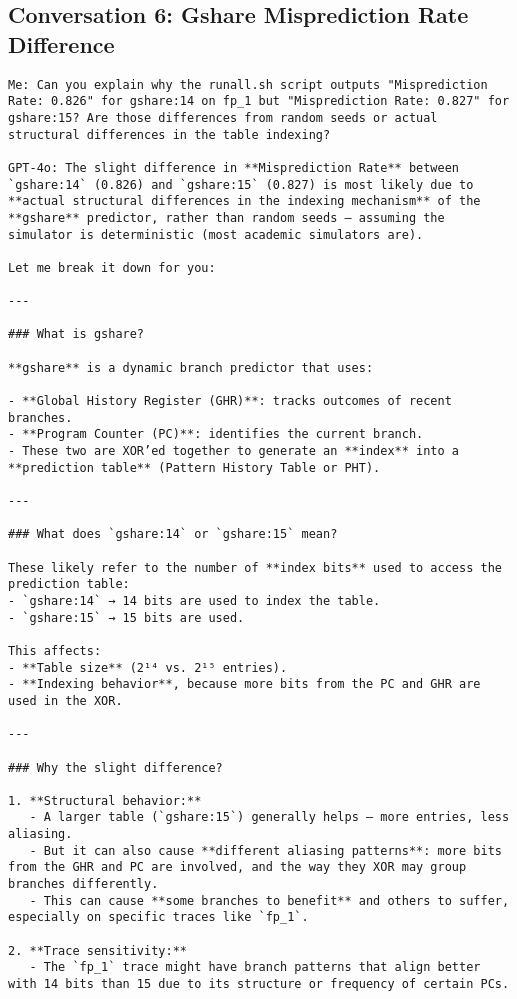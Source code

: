 \documentclass[sigconf, screen]{acmart}
\begin{document}
\subsection{Conversation 6: Gshare Misprediction Rate Difference}
\begin{Verbatim}[fontsize=\tiny, breaklines=true]
Me: Can you explain why the runall.sh script outputs "Misprediction Rate: 0.826" for gshare:14 on fp_1 but "Misprediction Rate: 0.827" for gshare:15? Are those differences from random seeds or actual structural differences in the table indexing?

GPT-4o: The slight difference in **Misprediction Rate** between `gshare:14` (0.826) and `gshare:15` (0.827) is most likely due to **actual structural differences in the indexing mechanism** of the **gshare** predictor, rather than random seeds — assuming the simulator is deterministic (most academic simulators are).

Let me break it down for you:

---

### What is gshare?

**gshare** is a dynamic branch predictor that uses:

- **Global History Register (GHR)**: tracks outcomes of recent branches.
- **Program Counter (PC)**: identifies the current branch.
- These two are XOR’ed together to generate an **index** into a **prediction table** (Pattern History Table or PHT).

---

### What does `gshare:14` or `gshare:15` mean?

These likely refer to the number of **index bits** used to access the prediction table:
- `gshare:14` → 14 bits are used to index the table.
- `gshare:15` → 15 bits are used.

This affects:
- **Table size** (2¹⁴ vs. 2¹⁵ entries).
- **Indexing behavior**, because more bits from the PC and GHR are used in the XOR.

---

### Why the slight difference?

1. **Structural behavior:**
   - A larger table (`gshare:15`) generally helps — more entries, less aliasing.
   - But it can also cause **different aliasing patterns**: more bits from the GHR and PC are involved, and the way they XOR may group branches differently.
   - This can cause **some branches to benefit** and others to suffer, especially on specific traces like `fp_1`.

2. **Trace sensitivity:**
   - The `fp_1` trace might have branch patterns that align better with 14 bits than 15 due to its structure or frequency of certain PCs.


\end{Verbatim}
\end{document}
